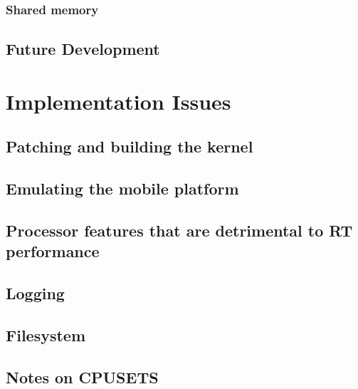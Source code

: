 \documentclass[a4paper,12pt]{report}
\begin{document}
\subsection{Shared memory}
\section{Future Development}

\newpage
\chapter{Implementation Issues}
\section{Patching and building the kernel}
\section{Emulating the mobile platform}
\section{Processor features that are detrimental to RT performance}
\section{Logging}
\section{Filesystem}
\section{Notes on CPUSETS} %

\printbibliography
\end{document}
